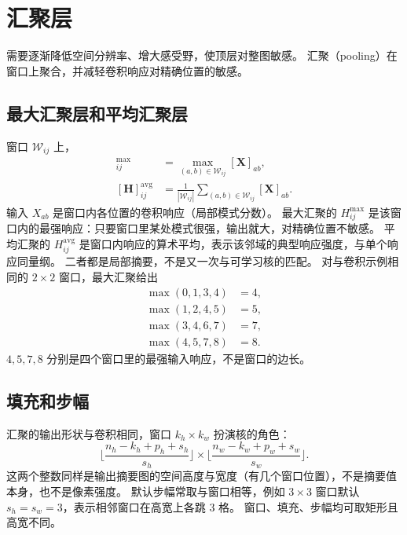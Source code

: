 \section{汇聚层}



需要逐渐降低空间分辨率、增大感受野，使顶层对整图敏感。
汇聚（pooling）在窗口上聚合，并减轻卷积响应对精确位置的敏感。

\subsection{最大汇聚层和平均汇聚层}

窗口 $\mathcal{W}_{ij}$ 上，
\begin{align*}
[\bm{H}]_{ij}^{\mathrm{max}}
&=
\max_{(a,b)\in\mathcal{W}_{ij}}[\bm{X}]_{ab},\\
[\bm{H}]_{ij}^{\mathrm{avg}}
&=
\frac{1}{|\mathcal{W}_{ij}|}\sum_{(a,b)\in\mathcal{W}_{ij}}[\bm{X}]_{ab}.
\end{align*}
输入 $X_{ab}$ 是窗口内各位置的卷积响应（局部模式分数）。
最大汇聚的 $H_{ij}^{\mathrm{max}}$ 是该窗口内的最强响应：只要窗口里某处模式很强，输出就大，对精确位置不敏感。
平均汇聚的 $H_{ij}^{\mathrm{avg}}$ 是窗口内响应的算术平均，表示该邻域的典型响应强度，与单个响应同量纲。
二者都是局部摘要，不是又一次与可学习核的匹配。
对与卷积示例相同的 $2\times 2$ 窗口，最大汇聚给出
\begin{align*}
\max(0,1,3,4)&=4,\\
\max(1,2,4,5)&=5,\\
\max(3,4,6,7)&=7,\\
\max(4,5,7,8)&=8.
\end{align*}
$4,5,7,8$ 分别是四个窗口里的最强输入响应，不是窗口的边长。

\subsection{填充和步幅}

汇聚的输出形状与卷积相同，窗口 $k_h\times k_w$ 扮演核的角色：
\[
\biggl\lfloor
\frac{n_h-k_h+p_h+s_h}{s_h}
\biggr\rfloor
\times
\biggl\lfloor
\frac{n_w-k_w+p_w+s_w}{s_w}
\biggr\rfloor.
\]
这两个整数同样是输出摘要图的空间高度与宽度（有几个窗口位置），不是摘要值本身，也不是像素强度。
默认步幅常取与窗口相等，例如 $3\times 3$ 窗口默认 $s_h=s_w=3$，表示相邻窗口在高宽上各跳 $3$ 格。
窗口、填充、步幅均可取矩形且高宽不同。


